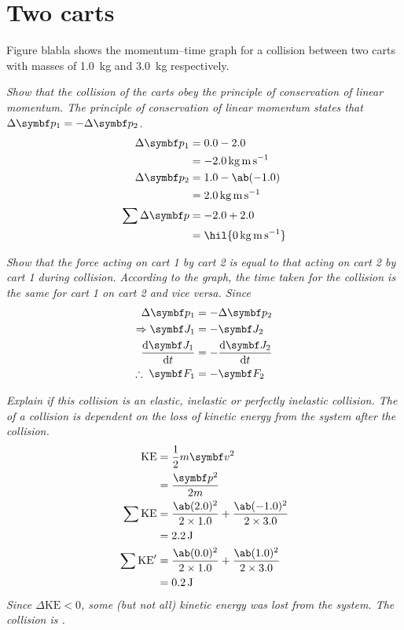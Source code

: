 \section{Two carts}
Figure blabla shows the momentum--time graph for a collision between
two carts with masses of \qty{1.0}{\kg}
and \qty{3.0}{\kg} respectively.

\it{Show that the collision of the carts obey the principle of
conservation of linear momentum.}
The principle of conservation of linear momentum states that
\(\Delta\mv{p}_1 = -\Delta\mv{p}_2\).
\begin{align*}
  \Delta\mv{p}_1 &= 0.0 - 2.0 \\
  &= \qty{-2.0}{\kg\m\per\second} \\
  \Delta\mv{p}_2 &= 1.0 - \ab(-1.0) \\
  &= \qty{2.0}{\kg\m\per\second} \\
  \sum\Delta\mv{p} &= -2.0 + 2.0 \\
  &= \hil{\qty{0}{\kg\m\per\second}}
\end{align*}

\it{Show that the force acting on cart 1 by cart 2 is equal to that
acting on cart 2 by cart 1 during collision.}
According to the graph, the time taken for the collision is the same
for cart 1 on cart 2
and vice versa. Since
\begin{align*}
  \Delta\mv{p}_1 &= -\Delta\mv{p}_2 \\
  \Rightarrow \mv{J}_1 &= -\mv{J}_2 \\
  \odv{\mv{J}_1}{t} &= -\odv{\mv{J}_2}{t} \\
  \therefore\; \mv{F}_1 &= -\mv{F}_2
\end{align*}

\it{Explain if this collision is an elastic, inelastic or perfectly
inelastic collision.}
The  of a collision is dependent on the loss of kinetic energy
from the system after the collision.
\begin{align*}
  \text{KE} &= \f{1}{2}m\mv{v}^2 \\
  &= \f{\mv{p}^2}{2m} \\
  \sum \text{KE} &= \f{\ab(2.0)^2}{2\times 1.0} +
  \f{\ab(-1.0)^2}{2\times 3.0} \\
  &= \qty{2.2}{\joule} \\
  \sum \text{KE}' &= \f{\ab(0.0)^2}{2\times 1.0} +
  \f{\ab(1.0)^2}{2\times 3.0} \\
  &= \qty{0.2}{\joule}
\end{align*}
Since \(\Delta\text{KE} < 0\), some (but not all) kinetic energy was
lost from the system. The collision is .

